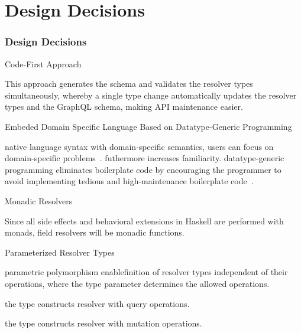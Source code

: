 
\section{Design Decisions} 

\begin{frame}[allowframebreaks]\frametitle{Design Decisions}
\begin{block}{Code-First Approach}  

This approach generates the schema and validates the resolver types simultaneously, whereby a single type change automatically updates the resolver types and the GraphQL schema, making API maintenance easier.

\end{block}

\begin{block}{Embeded Domain Specific Language Based on Datatype-Generic Programming}  

native language syntax with domain-specific semantics, users can focus on domain-specific problems~\cite{edsl-modeling}. futhermore increases familiarity. datatype-generic programming eliminates boilerplate code by encouraging the programmer to avoid implementing tedious and high-maintenance boilerplate code~\cite{scrap-your-boilerplate}.

\end{block}

\begin{block}{Monadic Resolvers} 

Since all side effects and behavioral extensions in Haskell are performed with monads, field resolvers will be monadic functions. 
\end{block}


\begin{block}{Parameterized Resolver Types}

parametric polymorphism enablefinition of resolver types independent of their operations, where the type parameter determines the allowed operations.  


the type  constructs resolver  with query operations. 
 
the type  constructs resolver  with mutation operations.

\end{block}
\end{frame}